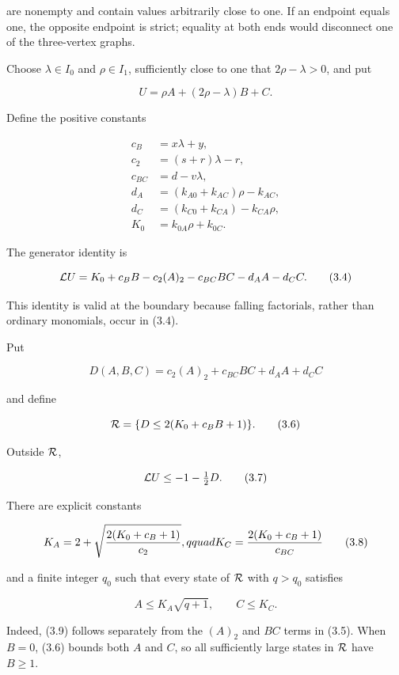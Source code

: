 are nonempty and contain values arbitrarily close to one. If an endpoint
equals one, the opposite endpoint is strict; equality at both ends would
disconnect one of the three-vertex graphs.

Choose \(\lambda\in I_0\) and \(\rho\in I_1\), sufficiently close to one
that \(2\rho-\lambda>0\), and put

\[
 U=\rho A+(2\rho-\lambda)B+C.                              \tag{3.2}
\]

Define the positive constants

\[
\begin{aligned}
 c_B&=x\lambda+y,\\
 c_2&=(s+r)\lambda-r,\\
 c_{BC}&=d-v\lambda,\\
 d_A&=(k_{A0}+k_{AC})\rho-k_{AC},\\
 d_C&=(k_{C0}+k_{CA})-k_{CA}\rho,\\
 K_0&=k_{0A}\rho+k_{0C}.
\end{aligned}                                               \tag{3.3}
\]

The generator identity is

\[
 {\cal L}U
 =K_0+c_BB-c_2(A)_2-c_{BC}BC-d_AA-d_CC.                    \tag{3.4}
\]

This identity is valid at the boundary because falling factorials,
rather than ordinary monomials, occur in (3.4).

Put

\[
 D(A,B,C)=c_2(A)_2+c_{BC}BC+d_AA+d_CC                       \tag{3.5}
\]

and define

\[
 {\cal R}=\{D\le 2(K_0+c_BB+1)\}.                         \tag{3.6}
\]

Outside \({\cal R}\),

\[
 {\cal L}U\le-1-\tfrac12D.                               \tag{3.7}
\]

There are explicit constants

\[
 K_A=2+\sqrt{{2(K_0+c_B+1)\over c_2}},qquad
 K_C={2(K_0+c_B+1)\over c_{BC}}                            \tag{3.8}
\]

and a finite integer \(q_0\) such that every state of \({\cal R}\) with
\(q>q_0\) satisfies

\[
 A\le K_A\sqrt{q+1},\qquad C\le K_C.                       \tag{3.9}
\]

Indeed, (3.9) follows separately from the \((A)_2\) and \(BC\) terms in
(3.5). When \(B=0\), (3.6) bounds both \(A\) and \(C\), so all
sufficiently large states in \({\cal R}\) have \(B\ge1\).

